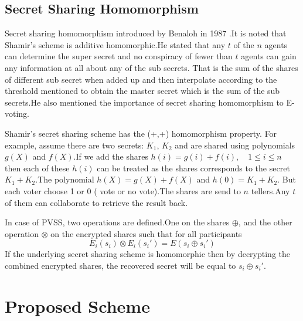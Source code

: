 \documentclass[conference]{IEEEtran}
\begin{document}
\subsection{Secret Sharing Homomorphism}

Secret sharing homomorphism introduced by Benaloh in 1987 \cite{benaloh1987secret}.It is noted that Shamir's scheme is additive homomorphic.He stated that any $t$ of the $n$ agents can determine the super secret and no conspiracy of fewer than $t$ agents can gain any information at all about any of the sub secrets. That is the sum of the shares of different sub secret when added up and then interpolate according to the threshold mentioned to obtain the master secret which is the sum of the sub secrets.He also mentioned the importance of secret sharing homomorphism to E-voting.

Shamir's secret sharing scheme has the (+,+) homomorphism property. For example, assume there are two secrets: $K_1$, $K_2$ and are shared using polynomials $g(X)$ and $f(X)$.If we add the shares $h(i)=g(i)+f(i),\quad 1 \le i \le n$ then each of these $h(i)$ can be treated as the shares corresponds to the secret $K_1+K_2$.The polynomial $h(X)=g(X)+ f(X)$ and $h(0)=K_1+K_2$.
But each voter choose 1 or 0 ( vote or no vote).The shares are send to $n$ tellers.Any $t$ of them can collaborate to retrieve the result back.

In case of PVSS, two operations are defined.One on the shares  $\oplus$, and the other operation $\otimes$ on the encrypted shares such that for all participants
$$E_i(s_i) \otimes E_i(s_i')=E(s_i\oplus s_i')$$
If the underlying secret sharing scheme is homomorphic then by decrypting the combined encrypted shares, the recovered secret will be equal to $s_i \oplus s_i'$.

\section{Proposed Scheme}
\end{document}
